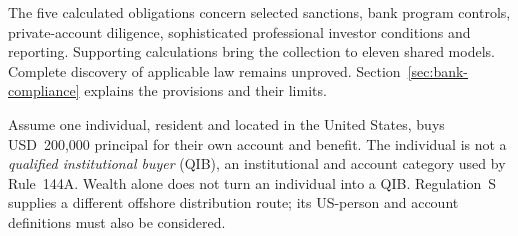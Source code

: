 \documentclass[12pt,a4paper,oneside,openany]{book}
\begin{document}
The five calculated obligations concern selected sanctions, bank program
controls, private-account diligence, sophisticated professional investor
conditions and reporting. Supporting calculations bring the collection to
eleven shared models. Complete discovery of applicable law remains unproved.
Section~\ref{sec:bank-compliance} explains the provisions and their limits.

\clearpage
{}
Assume one individual, resident and located in the United States, buys
USD~200,000 principal for their own account and benefit. The individual is not
a \emph{qualified institutional buyer} (QIB), an institutional and account
category used by Rule~144A. Wealth alone does not turn an individual into a
QIB. Regulation~S supplies a different offshore distribution route; its
US-person and account definitions must also be considered.
\end{document}
